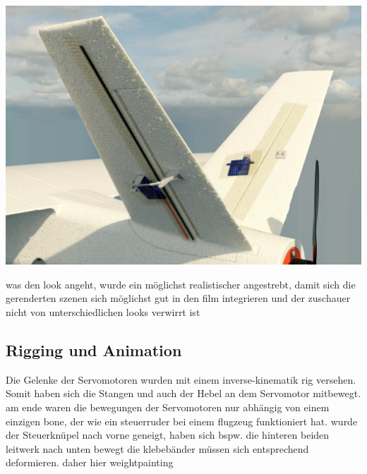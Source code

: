 \includegraphics[width=\textwidth]{gfx/prod/plane/shading.jpg}


was den look angeht, wurde ein möglichst realistischer angestrebt, damit sich die gerenderten szenen sich möglichst gut in den film integrieren und der zuschauer nicht von unterschiedlichen looks verwirrt ist

\subsection{Rigging und Animation}

Die Gelenke der Servomotoren wurden mit einem inverse-kinematik rig versehen. Somit haben sich die Stangen und auch der Hebel an dem Servomotor mitbewegt.
am ende waren die bewegungen der Servomotoren nur abhängig von einem einzigen bone, der wie ein steuerruder bei einem flugzeug funktioniert hat.
wurde der Steuerknüpel nach vorne geneigt, haben sich bspw. die hinteren beiden  leitwerk nach unten bewegt
die klebebänder müssen sich entsprechend deformieren.
daher hier weightpainting


